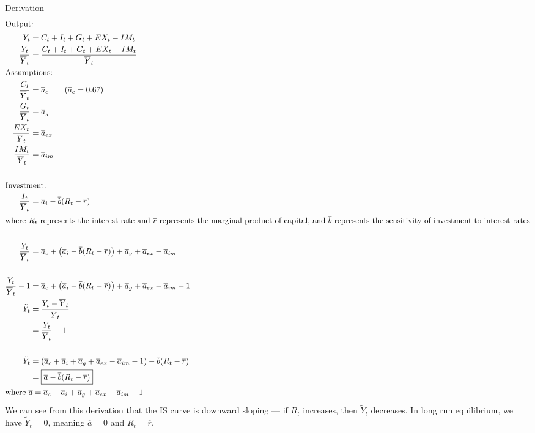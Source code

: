 \documentclass[10pt]{extarticle}
\title{}
\author{Avinash Iyer}
\date{}
\begin{document}
{
\begin{problem}{Derivation}
  \begin{align*}
    \shortintertext{Output:}
    Y_{t} &= C_t + I_t + G_t + EX_t - IM_t \\
    \frac{Y_t}{\overline{Y}_t} &= \frac{C_t + I_t + G_t + EX_t - IM_t}{\overline{Y}_t} \\
    \shortintertext{Assumptions:}
    \frac{C_t}{\overline{Y}_t} &= \overline{a}_{c} \tag*{$\left(\overline{a}_c = 0.67\right)$}\\
    \frac{G_t}{\overline{Y}_t} &= \overline{a}_g\\
    \frac{EX_t}{\overline{Y}_t} &= \overline{a}_{ex} \\
    \frac{IM_t}{\overline{Y}_t} &= \overline{a}_{im} \\
    \\
    \shortintertext{Investment:}
    \frac{I_t}{\overline{Y}_t} &= \overline{a}_i - \overline{b}(R_t - \overline{r}) \\
    \intertext{where $R_t$ represents the interest rate and $\overline{r}$ represents the marginal product of capital, and $\overline{b}$ represents the sensitivity of investment to interest rates} \\
    \frac{Y_t}{\overline{Y}_t} &= \overline{a}_c + \left(\overline{a}_i - \overline{b}(R_t - \overline{r})\right) + \overline{a}_g + \overline{a}_{ex} - \overline{a}_{im} \\
    \\
    \frac{Y_t}{\overline{Y}_t} - 1 &= \overline{a}_c + \left(\overline{a}_i - \overline{b}(R_t - \overline{r})\right) + \overline{a}_g + \overline{a}_{ex} - \overline{a}_{im} - 1 \\
    \tilde{Y}_t &= \frac{Y_t - \overline{Y}_t}{\overline{Y}_t} \\
                &= \frac{Y_t}{\overline{Y}_t} - 1 \\
                \\
    \tilde{Y}_t &= \left(\overline{a}_c + \overline{a}_i + \overline{a}_g + \overline{a}_{ex} - \overline{a}_{im} - 1\right) - \overline{b}(R_t - \overline{r}) \\
                &= \boxed{\overline{a} - \overline{b}(R_t - \overline{r})}\\
                \intertext{where $\overline{a} = \overline{a}_c + \overline{a}_i + \overline{a}_g + \overline{a}_{ex} - \overline{a}_{im} - 1$}
  \end{align*} 
  We can see from this derivation that the IS curve is downward sloping --- if $R_t$ increases, then $\tilde{Y}_t$ decreases. In long run equilibrium, we have $\tilde{Y}_t = 0$, meaning $\overline{a} = 0$ and $R_t = \overline{r}$.
\end{problem}
}
\end{document}
